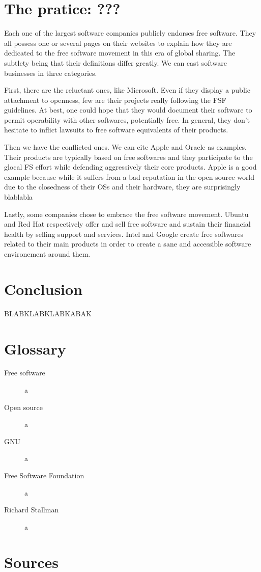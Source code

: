 \documentclass[12pt]{article}
\begin{document}
\section{The pratice: ???}

Each one of the largest software companies publicly endorses free
software. They all possess one or several pages on their websites to
explain how they are dedicated to the free software movement in this
era of global sharing. The subtlety being that their definitions
differ greatly. We can cast software businesses in three categories.

First, there are the reluctant ones, like Microsoft. Even if they
display a public attachment to openness, few are their projects really
following the FSF guidelines. At best, one could hope that they would
document their software to permit operability with other softwares,
potentially free. In general, they don't hesitate to inflict lawsuits
to free software equivalents of their products.

Then we have the conflicted ones. We can cite Apple and Oracle as
examples. Their products are typically based on free softwares and
they participate to the glocal FS effort while defending aggressively
their core products. Apple is a good example because while it suffers
from a bad reputation in the open source world due to the closedness
of their OSs and their hardware, they are surprisingly blablabla

Lastly, some companies chose to embrace the free software
movement. Ubuntu and Red Hat respectively offer and sell free software
and sustain their financial health by selling support and
services. Intel and Google create free softwares related to their main
products in order to create a sane and accessible software
environement around them.

\section*{Conclusion}

BLABKLABKLABKABAK

\section*{Glossary}

\begin{description}
  \item[Free software]{a}
  \item[Open source]{a}
  \item[GNU]{a}
  \item[Free Software Foundation]{a}
  \item[Richard Stallman]{a}
\end{description}

\section*{Sources}



\end{document}
